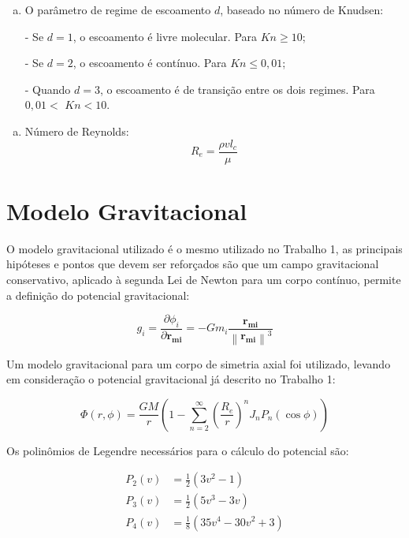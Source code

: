\begin{enumerate}[(f)] 
  \item O parâmetro de regime de escoamento $d$, baseado no número de Knudsen:

  - Se $d=1$, o escoamento é livre molecular. Para $K n \geq 10$;

  - Se $d=2$, o escoamento é contínuo. Para $K n \leq 0,01$;

  - Quando $d=3$, o escoamento é de transição entre os dois regimes. Para $0,01<$ $K n<10$.
\end{enumerate}

\begin{enumerate}[(g)] 
\item Número de Reynolds:
\begin{equation}
R_e =\frac{\rho v l_{c}}{\mu}
\end{equation}
\end{enumerate}


\section{Modelo Gravitacional}

O modelo gravitacional utilizado é o mesmo utilizado no Trabalho 1, as principais hipóteses e pontos que devem ser reforçados são que um campo gravitacional conservativo, aplicado à segunda Lei de Newton para um corpo contínuo, permite a definição do potencial gravitacional:

\begin{equation}
g_i = \frac{\partial \phi_i}{\partial \mathbf{r}_{\mathbf{mi}}} = -Gm_i \frac{\mathbf{r}_{\mathbf{mi}}}{\left\|\mathbf{r}_{\mathbf{mi}}\right\|^3}
\end{equation}


Um modelo gravitacional para um corpo de simetria axial foi utilizado, levando em consideração o potencial gravitacional já descrito no Trabalho 1:

\begin{equation}
\Phi(r, \phi) = \frac{GM}{r}\left(1 - \sum_{n=2}^{\infty}\left(\frac{R_e}{r}\right)^n J_n P_n(\cos \phi)\right)
\end{equation}

Os polinômios de Legendre necessários para o cálculo do potencial são:

\begin{align}
P_2(v) &= \frac{1}{2}\left(3v^2 - 1\right) \\
P_3(v) &= \frac{1}{2}\left(5v^3 - 3v\right) \\
P_4(v) &= \frac{1}{8}\left(35v^4 - 30v^2 + 3\right)
\end{align}

